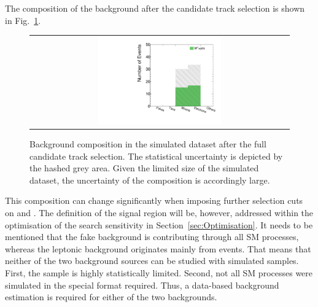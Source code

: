 The composition of the background after the candidate track selection is shown in Fig.~\ref{fig:BkgComposition}.
\begin{figure}[!bt]
  \centering 
  \begin{tabular}{c}
    \includegraphics[width=0.49\textwidth]{figures/analysis/AnalysisSelection/chiTracksfullSelectionTrigger_Wjets/htrackgenParticleSmallRange_lin.pdf}
  \end{tabular}
  \caption{Background composition in the simulated \WJets dataset after the full candidate track selection.
           The statistical uncertainty is depicted by the hashed grey area.
           Given the limited size of the simulated \WJets dataset, the uncertainty of the composition is accordingly large.}
  \label{fig:BkgComposition}
\end{figure}
This composition can change significantly when imposing further selection cuts on \pt and \ias.
The definition of the signal region will be, however, addressed within the optimisation of the search sensitivity in Section~\ref{sec:Optimisation}.
It needs to be mentioned that the fake background is contributing through all SM processes, whereas the leptonic background originates mainly from \WJets events.
That means that neither of the two background sources can be studied with simulated samples.
First, the \WJets sample is highly statistically limited.
Second, not all SM processes were simulated in the special format required. 
Thus, a data-based background estimation is required for either of the two backgrounds.


